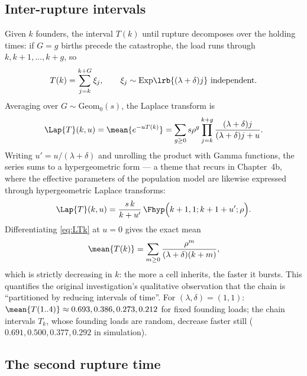 \subsection{Inter-rupture intervals}

Given $k$ founders, the interval $T(k)$ until rupture decomposes over the
holding times: if $G=g$ births precede the catastrophe, the load runs
through $k,k+1,\ldots,k+g$, so
\begin{equation}
T(k)=\sum_{j=k}^{k+G}\xi_j,
\qquad
\xi_j\sim\mathrm{Exp}\lrb{(\lambda+\delta)j}\ \text{independent}.
\end{equation}
Averaging over $G\sim\mathrm{Geom}_0(s)$, the Laplace transform is
\begin{equation}
\Lap{T}(k,u)=\mean{e^{-uT(k)}}
=\sum_{g\ge0}s\rho^g\prod_{j=k}^{k+g}\frac{(\lambda+\delta)j}{(\lambda+\delta)j+u}.
\label{eq:LTk}
\end{equation}
Writing $u'=u/(\lambda+\delta)$ and unrolling the product with Gamma
functions, the series sums to a hypergeometric form --- a theme that recurs
in Chapter~4b, where the effective parameters of the population model are
likewise expressed through hypergeometric Laplace transforms:
\begin{equation}
\Lap{T}(k,u)=\frac{s\,k}{k+u'}\,\Fhyp\Bigl(k+1,1;k+1+u';\rho\Bigr).
\label{eq:LTk-hyp}
\end{equation}
Differentiating \eqref{eq:LTk} at $u=0$ gives the exact mean
\begin{equation}
\mean{T(k)}=\sum_{m\ge0}\frac{\rho^m}{(\lambda+\delta)(k+m)},
\label{eq:meanT}
\end{equation}
which is strictly decreasing in $k$: the more a cell inherits, the faster it
bursts. This quantifies the original investigation's qualitative
observation that the chain is ``partitioned by reducing intervals of time''.
For $(\lambda,\delta)=(1,1)$: $\mean{T(1..4)}\approx0.693,0.386,0.273,0.212$
for fixed founding loads; the chain intervals $T_k$, whose founding loads
are random, decrease faster still
($0.691,0.500,0.377,0.292$ in simulation).

\subsection{The second rupture time}

